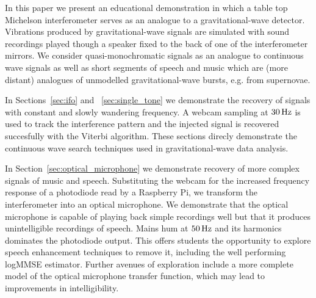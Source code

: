 \documentclass[paper-main.tex]{subfiles}
\begin{document}

In this paper we present an educational demonstration in which a table top Michelson interferometer serves as an analogue to a gravitational-wave detector. 
Vibrations produced by gravitational-wave signals are simulated with sound recordings played though a speaker fixed to the back of one of the interferometer mirrors. 
We consider quasi-monochromatic signals as an analogue to continuous wave signals as well as short segments of speech and music which are (more distant) analogues of unmodelled gravitational-wave bursts, e.g. from supernovae. 


In Sections~\ref{sec:ifo} and ~\ref{sec:single_tone} we demonstrate the recovery of signals with constant and slowly wandering frequency. 
A webcam sampling at $30\,{\rm Hz}$ is used to track the interference pattern and the injected signal is recovered succesfully with the Viterbi algorithm. 
These sections direcly demonstrate the continuous wave search techniques used in gravitational-wave data analysis. 


In Section~\ref{sec:optical_microphone} we demonstrate recovery of more complex signals of music and speech. 
Substituting the webcam for the increased frequency response of a photodiode read by a Raspberry Pi, we transform the interferometer into an optical microphone.
We demonstrate that the optical microphone is capable of playing back simple recordings well but that it produces unintelligible recordings of speech. 
Mains hum at $50\,{\rm Hz}$ and its harmonics dominates the photodiode output. 
This offers students the opportunity to explore speech enhancement techniques to remove it, including the well performing logMMSE estimator. 
Further avenues of exploration include a more complete model of the optical microphone transfer function, which may lead to improvements in intelligibility. 
\end{document}
